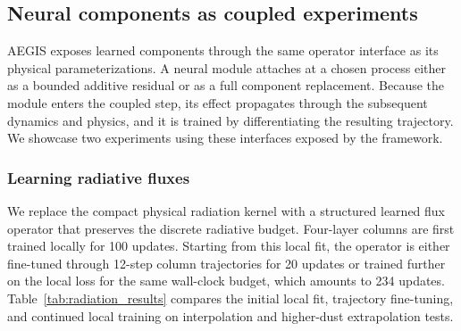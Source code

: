 \documentclass{article} %
\begin{document}


\subsection{Neural components as coupled experiments}
AEGIS exposes learned components through the same operator interface as its physical parameterizations. A neural module attaches at a chosen process either as a bounded additive residual or as a full component replacement. Because the module enters the coupled step, its effect propagates through the subsequent dynamics and physics, and it is trained by differentiating the resulting trajectory. We showcase two experiments using these interfaces exposed by the framework.




\subsubsection{Learning radiative fluxes}
We replace the compact physical radiation kernel with a structured learned flux operator that preserves the discrete radiative budget. Four-layer columns are first trained locally for 100 updates. Starting from this local fit, the operator is either fine-tuned through 12-step column trajectories for 20 updates or trained further on the local loss for the same wall-clock budget, which amounts to 234 updates. Table~\ref{tab:radiation_results} compares the initial local fit, trajectory fine-tuning, and continued local training on interpolation and higher-dust extrapolation tests.
\end{document}
